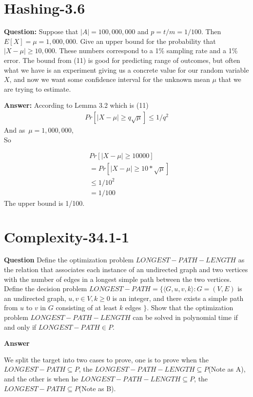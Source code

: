 \documentclass[12pt]{article}
\begin{document}
\section{Hashing-3.6}
\textbf{Question:}
Suppose that $|A| = 100,000,000$ and $p = t/m = 1/100$. Then $E[X] = \mu = 1,000,000$. Give an upper bound for the probability that $|X - \mu| \geq 10,000$. These numbers correspond to a 1\% sampling rate and a 1\% error. 
The bound from (11) is good for predicting range of outcomes, but often what we have is an experiment giving us a concrete value for our random variable $X$, and now we want some confidence interval for the unknown mean $\mu$ that we are trying to estimate.

\textbf{Answer:}
According to Lemma 3.2 which is (11)
\begin{align}
    Pr[|X - \mu| \geq q\sqrt{\mu}] \leq 1 / q^2
\end{align}
And as \,$\mu = 1,000,000$,\\
So 

\begin{equation}
\begin{aligned}
    &Pr[|X - \mu| \geq 10000]\\
    &=  Pr[|X - \mu| \geq 10 *\sqrt{\mu}]\\
    & \leq 1/10^2\\
    &= 1/100
\end{aligned}
\end{equation}
The upper bound is 1/100.

\section{Complexity-34.1-1}
\textbf{Question}
Define the optimization problem $LONGEST-PATH-LENGTH$ as the relation that associates each instance of an undirected graph and two vertices with the number of edges in a longest simple path between the two vertices. Define the decision problem $LONGEST-PATH= \{\langle G, u, v, k\rangle: G = (V, E)$ is an undirected graph, $u, v \in V, k \ge 0$ is an integer, and there exists a simple path from $u$ to $v$ in $G$ consisting of at least $k$ edges $\}$. Show that the optimization problem $LONGEST-PATH-LENGTH$ can be solved in polynomial time if and only if $LONGEST-PATH \in P$.

\textbf{Answer}

We split the target into two cases to prove, one is to prove when the $LONGEST-PATH \subseteq P$, the $LONGEST-PATH-LENGTH \subseteq P$(Note as A), and the other is when he $LONGEST-PATH-LENGTH \subseteq P$, the $LONGEST-PATH \subseteq P$(Note as B).
 
\end{document}

